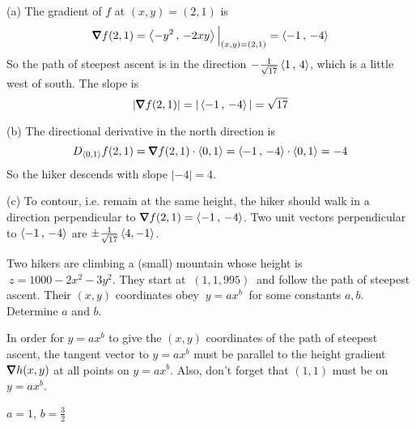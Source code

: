\begin{solution}
(a) The gradient of $f$ at $(x,y)=(2,1)$ is
\begin{align*}
\vnabla f(2,1) = \llt -y^2\,,\,-2xy \rgt\Big|_{(x,y)=(2,1)}
               = \llt -1\,,\, -4\rgt
\end{align*}
So the path of steepest ascent is in the direction 
$-\frac{1}{\sqrt{17}}\left< 1\,,\, 4\right>$, which is a little
west of south. The slope is
\begin{equation*}
|\vnabla f(2,1)| = |\llt -1\,,\, -4\rgt| = \sqrt{17}
\end{equation*}

(b) The directional derivative in the north direction is
\begin{equation*}
D_{\llt 0,1\rgt}f(2,1) = \vnabla f(2,1)\cdot\llt 0,1\rgt
               = \llt -1\,,\, -4\rgt \cdot \llt 0,1\rgt = -4
\end{equation*}
So the hiker descends with slope $|-4|=4$.

(c) To contour, i.e. remain at the same height, the hiker should walk
in a direction perpendicular to $\vnabla f(2,1)= \llt -1\,,\, -4\rgt$.
Two unit vectors perpendicular to $\left< -1\,,\, -4\right>$
are $\pm\frac{1}{\sqrt{17}}\left< 4, -1\right>$.
\end{solution}

\begin{question}
Two hikers are climbing a (small) mountain whose height is 
$\ z=1000-2x^2-3y^2.$ 
They start at $\ (1,1,995)\ $ and follow the path of steepest ascent. Their
$(x,y)$ coordinates obey $\ y=ax^b\ $ for some constants $a, b$. 
Determine $a$ and $b$.
\end{question}

\begin{hint}
In order for $y=ax^b$ to give the $(x,y)$ coordinates of the
path of steepest ascent,  the tangent vector to $y=ax^b$ must be parallel
to the height gradient $\vnabla h(x,y)$ at all points on $y=ax^b$.
Also, don't forget that $(1,1)$ must be on $y=ax^b$.
\end{hint}

\begin{answer}
$a=1$, $b=\frac{3}{2}$
\end{answer}

